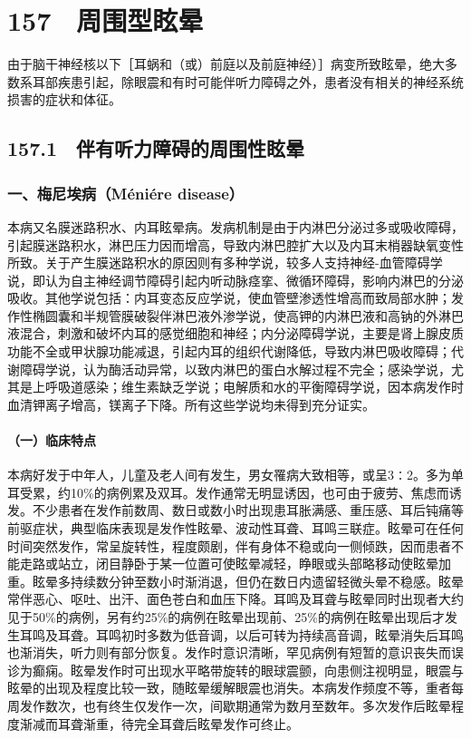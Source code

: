 \protect\hypertarget{text00359.html}{}{}

\section{157　周围型眩晕}

由于脑干神经核以下［耳蜗和（或）前庭以及前庭神经）］病变所致眩晕，绝大多数系耳部疾患引起，除眼震和有时可能伴听力障碍之外，患者没有相关的神经系统损害的症状和体征。

\subsection{157.1　伴有听力障碍的周围性眩晕}

\subsubsection{一、梅尼埃病（Méniére disease）}

本病又名膜迷路积水、内耳眩晕病。发病机制是由于内淋巴分泌过多或吸收障碍，引起膜迷路积水，淋巴压力因而增高，导致内淋巴腔扩大以及内耳末梢器缺氧变性所致。关于产生膜迷路积水的原因则有多种学说，较多人支持神经-血管障碍学说，即认为自主神经调节障碍引起内听动脉痉挛、微循环障碍，影响内淋巴的分泌吸收。其他学说包括：内耳变态反应学说，使血管壁渗透性增高而致局部水肿；发作性椭圆囊和半规管膜破裂伴淋巴液外渗学说，使高钾的内淋巴液和高钠的外淋巴液混合，刺激和破坏内耳的感觉细胞和神经；内分泌障碍学说，主要是肾上腺皮质功能不全或甲状腺功能减退，引起内耳的组织代谢降低，导致内淋巴吸收障碍；代谢障碍学说，认为酶活动异常，以致内淋巴的蛋白水解过程不完全；感染学说，尤其是上呼吸道感染；维生素缺乏学说；电解质和水的平衡障碍学说，因本病发作时血清钾离子增高，镁离子下降。所有这些学说均未得到充分证实。

\paragraph{（一）临床特点}

本病好发于中年人，儿童及老人间有发生，男女罹病大致相等，或呈3∶2。多为单耳受累，约10\%的病例累及双耳。发作通常无明显诱因，也可由于疲劳、焦虑而诱发。不少患者在发作前数周、数日或数小时出现患耳胀满感、重压感、耳后钝痛等前驱症状，典型临床表现是发作性眩晕、波动性耳聋、耳鸣三联症。眩晕可在任何时间突然发作，常呈旋转性，程度颇剧，伴有身体不稳或向一侧倾跌，因而患者不能走路或站立，闭目静卧于某一位置可使眩晕减轻，睁眼或头部略移动使眩晕加重。眩晕多持续数分钟至数小时渐消退，但仍在数日内遗留轻微头晕不稳感。眩晕常伴恶心、呕吐、出汗、面色苍白和血压下降。耳鸣及耳聋与眩晕同时出现者大约见于50\%的病例，另有约25\%的病例在眩晕出现前、25\%的病例在眩晕出现后才发生耳鸣及耳聋。耳鸣初时多数为低音调，以后可转为持续高音调，眩晕消失后耳鸣也渐消失，听力则有部分恢复。发作时意识清晰，罕见病例有短暂的意识丧失而误诊为癫痫。眩晕发作时可出现水平略带旋转的眼球震颤，向患侧注视明显，眼震与眩晕的出现及程度比较一致，随眩晕缓解眼震也消失。本病发作频度不等，重者每周发作数次，也有终生仅发作一次，间歇期通常为数月至数年。多次发作后眩晕程度渐减而耳聋渐重，待完全耳聋后眩晕发作可终止。

